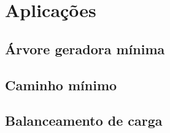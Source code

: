 \chapter{Aplicações}


\section{Árvore geradora mínima}

\section{Caminho mínimo}

\section{Balanceamento de carga}
